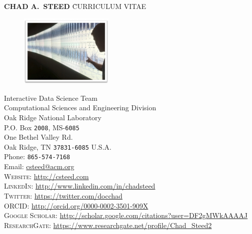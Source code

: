 \documentclass[11pt, letterpaper]{article}
\begin{document}
\thispagestyle{firststyle}



\begin{tabbing}
    {\sffamily \LARGE \textbf{CHAD A.\ STEED}} \` {\sffamily \LARGE CURRICULUM VITAE}
\end{tabbing}


\begin{figure}
  \vspace{-30pt}
  \begin{center}
    \includegraphics[width=0.4\textwidth]{climate-framed.png}
  \end{center}
  \vspace{-20pt}
\end{figure}

Interactive Data Science Team\\
Computational Sciences and Engineering Division\\
Oak Ridge National Laboratory\\
P.O. Box \texttt{2008}, MS-\texttt{6085}\\
One Bethel Valley Rd.\\
Oak Ridge, TN \texttt{37831-6085}
U.S.A.\\[.2cm]
Phone: \texttt{865-574-7168}\\
Email: \href{mailto:csteed@acm.org}{csteed@acm.org}\\[.2cm]
\textsc{Website}: \href{http://csteed.com}{http://csteed.com}\\
\textsc{LinkedIn}: \href{http://www.linkedin.com/in/chadsteed}{http://www.linkedin.com/in/chadsteed}\\
\textsc{Twitter}: \href{https://twitter.com/docchad}{https://twitter.com/docchad}\\
\textsc{ORCID}:
\href{http://orcid.org/0000-0002-3501-909X}{http://orcid.org/0000-0002-3501-909X}\\
\textsc{Google Scholar}: \href{http://scholar.google.com/citations?user=DF2gMWkAAAAJ}{http://scholar.google.com/citations?user=DF2gMWkAAAAJ}\\
\textsc{ResearchGate}: \href{https://www.researchgate.net/profile/Chad\_Steed2}{https://www.researchgate.net/profile/Chad\_Steed2}
\end{document}

